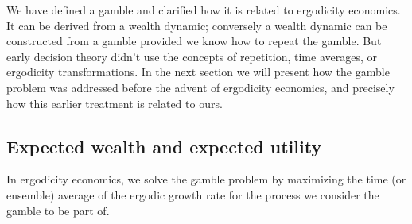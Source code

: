 
We have defined a gamble and clarified how it is related to ergodicity economics. 
It can be derived from a wealth dynamic; conversely a wealth dynamic can be 
constructed from a gamble provided we know 
how to repeat the gamble. But early decision theory didn't use the concepts of 
repetition, time averages, or ergodicity transformations. In the next section we will 
present how the gamble problem was addressed before the advent of ergodicity 
economics, and precisely how this earlier treatment is related to ours.

\subsection{Expected wealth and expected utility}

In ergodicity economics, we solve the gamble problem by maximizing the time 
(or ensemble) average of the ergodic growth rate for the process we consider 
the gamble to be part of. 

